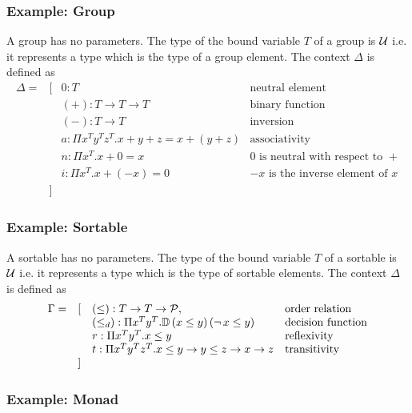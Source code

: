 \subsubsection{Example: Group}
A group has no parameters. The type of the bound variable $T$ of a group is
${\cal{U}}$ i.e. it represents a type which is the type of a group element. The
context $\Delta$ is defined as
$$
\begin{array}{llll}
  \Delta =
  &[
  & 0: T
  & \text{neutral element}
  \\
  &
  & (+): T \to T \to T
  & \text{binary function}
  \\
  &
  & (-): T \to T
  & \text{inversion}
  \\
  &
  & a: \Pi x^T y^T z^T. x + y + z = x + (y + z)
  & \text{associativity}
  \\
  &
  & n: \Pi x^T. x + 0 = x
  & 0 \text{ is neutral with respect to } +
  \\
  &
  & i: \Pi x^T. x + (-x) = 0
  & -x \text{ is the inverse element of } x
  \\
  &]
\end{array}
$$






\subsubsection{Example: Sortable}

A sortable has no parameters. The type of the bound variable $T$ of a sortable
is ${\cal{U}}$ i.e. it represents a type which is the type of sortable
elements. The context $\Delta$ is defined as
$$
\begin{array}{llll}
  \Gamma =
  &[
  & (\le): T \to T \to {\cal{P}},
  & \text{order relation}
  \\
  &
  & (\le_d): \Pi x^T y^T . {\mathbb{D}}\,(x \le y)\, (\lnot\, x \le y)
  & \text{decision function}
  \\
  &
  & r: \Pi x^T y^T. x \le y
  & \text{reflexivity}
  \\
  &
  & t: \Pi x^T y^T z^T. x \le y \to y \le z \to x \to z
  & \text{transitivity}
  \\
  &]
\end{array}
$$


\subsubsection{Example: Monad}

